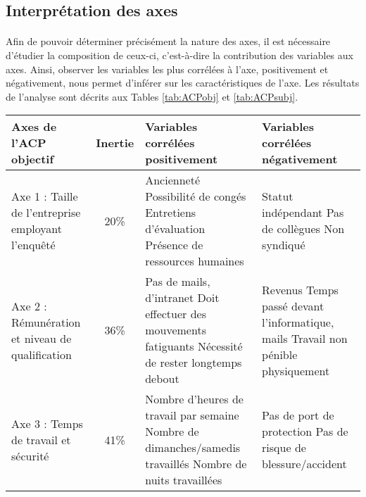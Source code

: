\documentclass[11pt,fleqn,openany,frenchb]{book} %
\begin{document}
\subsection{Interprétation des axes}
\paragraph{}
Afin de pouvoir déterminer précisément la nature des axes, il est nécessaire d'étudier la composition de ceux-ci, c'est-à-dire la contribution des variables aux axes. Ainsi, observer les variables les plus corrélées à l'axe, positivement et négativement, nous permet d'inférer sur les caractéristiques de l'axe. Les résultats de l'analyse sont décrits aux Tables \ref{tab:ACPobj} et \ref{tab:ACPsubj}.

\begin{table}[!h]
\centering
\begin{tabular}{|p{3cm}|c|p{4.8cm}|p{4.8cm}|}
\hline
    Axes de l'ACP \newline objectif & Inertie &  Variables corrélées positivement & Variables corrélées négativement\\ 
    \hline
    Axe 1 : Taille de l'entreprise employant l'enquêté & 20\% & Ancienneté \newline Possibilité de congés \newline Entretiens d'évaluation \newline Présence de ressources humaines & Statut indépendant \newline Pas de collègues  \newline Non syndiqué \\
    \hline
    Axe 2 : Rémunération et niveau de qualification  & 36\%
    & Pas de mails, d'intranet 
    \newline Doit effectuer des mouvements fatiguants 
    \newline Nécessité de rester longtemps debout 
    & Revenus 
    \newline Temps passé devant l'informatique, mails 
    \newline Travail non pénible physiquement\\
    \hline
    Axe 3 : Temps de travail et sécurité & 41\% &  
    Nombre d'heures de travail par semaine 
    \newline Nombre de dimanches/samedis travaillés
    \newline Nombre de nuits travaillées
    & Pas de port de protection
    \newline Pas de risque de blessure/accident

\end{tabular}
\end{table}
\end{document}
